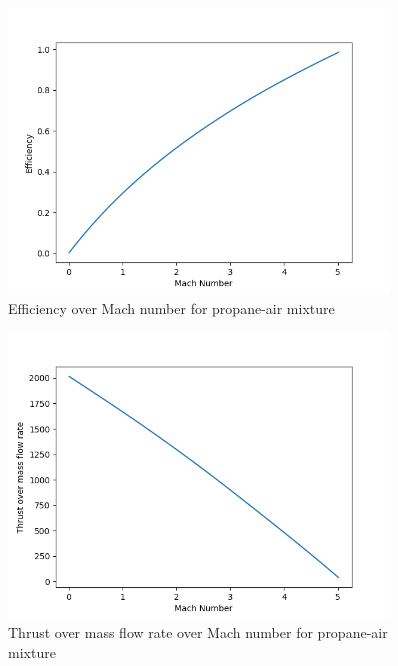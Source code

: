 \documentclass[a4paper,11pt]{article}
\begin{document}
	\begin{figure}[H]
		\centering
		\includegraphics[width=0.9\textwidth]{propan_pow(1mol)/Efficiency_over_Mach.png}
       		\caption{Efficiency over Mach number for propane-air mixture}
	\end{figure}
	\begin{figure}[H]
		\centering
		\includegraphics[width=0.9\textwidth]{propan_pow(1mol)/Thrust_over_mass_flow_rate_over_Mach.png}
       		\caption{Thrust over mass flow rate over Mach number for propane-air mixture}
	\end{figure}
\end{document}
